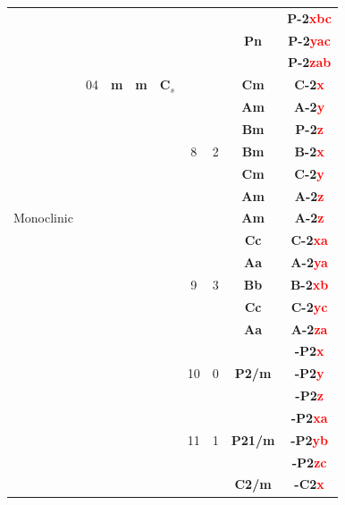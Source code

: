 \documentclass{article}      %
\begin{document}
\begin{small}
\begin{longtable}[c]{|c|c|c|c|c|c|c|c|c|}
 & & & & & & & &\textbf{P-2\textcolor{red}{xbc}}  \\\cline{9-9}
 & & & & & & &\textbf{Pn} &\textbf{P-2\textcolor{red}{yac}}  \\\cline{9-9}
 & & & & & & & &\textbf{P-2\textcolor{red}{zab}}  \\\cline{6-9}
 & \textrm{04} &\textbf{m} &\textbf{m} &$\mathbf{C}_s$ & & &\textbf{Cm}&\textbf{C-2\textcolor{red}{x}} \\\cline{9-9}
 & & & & & & &\textbf{Am} &\textbf{A-2\textcolor{red}{y}}  \\\cline{8-9}
 & & & & & & &\textbf{Bm} &\textbf{P-2\textcolor{red}{z}}  \\\cline{8-9}
 & & & & &\textrm{8} &2&\textbf{Bm} &\textbf{B-2\textcolor{red}{x}}  \\\cline{8-9}
 & & & & & & &\textbf{Cm} &\textbf{C-2\textcolor{red}{y}}  \\\cline{8-9}
 & & & & & & &\textbf{Am} &\textbf{A-2\textcolor{red}{z}}  \\\cline{6-9}
\textrm{Monoclinic} & & & & & & &\textbf{Am} &\textbf{A-2\textcolor{red}{z}}  \\\cline{8-9}
 & & & & & & &\textbf{Cc} &\textbf{C-2\textcolor{red}{xa}}  \\\cline{8-9}
 & & & & & & &\textbf{Aa} &\textbf{A-2\textcolor{red}{ya}}  \\\cline{8-9}
 & & & & &\textrm{9} &3&\textbf{Bb} &\textbf{B-2\textcolor{red}{xb}}  \\\cline{8-9}
 & & & & & & &\textbf{Cc} &\textbf{C-2\textcolor{red}{yc}}  \\\cline{8-9}
 & & & & & & &\textbf{Aa} &\textbf{A-2\textcolor{red}{za}}  \\\cline{2-9}
 & & & & & & & &\textbf{-P2\textcolor{red}{x}}  \\\cline{9-9}
 & & & & &\textrm{10} &0 &\textbf{P2/m}&\textbf{-P2\textcolor{red}{y}} \\\cline{9-9}
 & & & & & & & &\textbf{-P2\textcolor{red}{z}}  \\\cline{6-9}
 & & & & & & & &\textbf{-P2\textcolor{red}{xa}}  \\\cline{9-9}
 & & & & &\textrm{11} &1 &\textbf{P21/m}&\textbf{-P2\textcolor{red}{yb}} \\\cline{9-9}
 & & & & & & & &\textbf{-P2\textcolor{red}{zc}}  \\\cline{6-9}
 & & & & & & &\textbf{C2/m} &\textbf{-C2\textcolor{red}{x}}  \\\cline{8-9}

\end{longtable}
\end{small}
\end{document}
